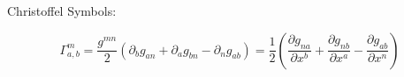 \documentclass[reqno]{amsart}
\begin{document}
 
Christoffel Symbols: 

\[ 
\Gamma_{a,b}^m 
	= \dfrac{g^{mn}}{2}(\partial_b g_{an}+\partial_a g_{bn}-\partial_n g_{ab})
	= \dfrac{1}{2} \left( 
			\dfrac{\partial g_{na}}{\partial x^b}
		+ \dfrac{\partial g_{nb}}{\partial x^a}
		- \dfrac{\partial g_{ab}}{\partial x^n}
\right)
\]  
\end{document}
